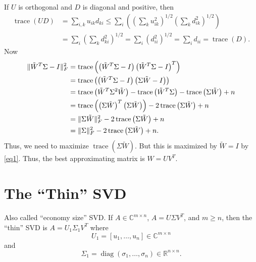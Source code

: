 \documentclass{article}
\begin{document}
If $U$ is orthogonal and $D$ is diagonal and positive, then
\begin{equation}\label{eq1}
\begin{aligned}
\operatorname{trace} (UD) &= \sum_{i,k} u_{ik} d_{ki} \leq \sum _{i}
\left ( \left ( \sum_{k} u_{ik}^{2} \right )^{1/2} \left ( \sum_{k}
d_{ik}^{2} \right )^{1/2} \right ) \\
&= \sum_{i} \left ( \sum_{k} d_{ki}^{2} \right )^{1/2} = \sum_{i}
\left ( d_{ii}^{2} \right )^{1/2} = \sum_{i} d_{ii} =
\operatorname{trace}(D).
\end{aligned}
\end{equation}
Now
\begin{align*}
\| \tilde{W}^{T} \Sigma - I \|_{F}^{2} &= \operatorname{trace}
\left ( \left( \tilde{W}^{T} \Sigma - I \right ) \left(
\tilde{W}^{T} \Sigma - I \right )^{T} \right ) \\
&= \operatorname{trace} \left ( \left( \tilde{W}^{T} \Sigma   - I
\right
) \left( \Sigma \tilde{W}  - I \right ) \right ) \\
&= \operatorname{trace} \left ( \tilde{W}^{T} \Sigma^{2} \tilde{W}
\right ) - \operatorname{trace} \left ( \tilde{W}^{T} \Sigma \right
) - \operatorname{trace} \left ( \Sigma \tilde{W} \right ) + n \\
&= \operatorname{trace} \left ( \left ( \Sigma \tilde{W} \right
)^{T} \left ( \Sigma \tilde{W}  \right ) \right ) - 2
\operatorname{trace} \left (\Sigma \tilde{W} \right ) + n \\
&= \| \Sigma \tilde{W} \|_{F}^{2} - 2 \operatorname{trace} \left
(\Sigma \tilde{W} \right ) + n \\
&= \| \Sigma  \|_{F}^{2} - 2 \operatorname{trace} \left (\Sigma
\tilde{W} \right ) + n.
\end{align*}
Thus, we need to maximize $\operatorname{trace} \left (\Sigma
\tilde{W} \right )$. But this is maximized by $ \tilde{W} = I$ by
\eqref{eq1}. Thus, the best approximating matrix is $W=UV^{T}$.


\section{The ``Thin'' SVD}
Also called ``economy size'' SVD.  If $A \in \mathbb{C}^{m \times
n}$, $A=U \Sigma V^{T}$, and $m \ge n$, then the ``thin'' SVD is
$A=U_{1} \Sigma_{1} V^{T}$ where
\begin{equation*}
U_{1} = [u_{1},\ldots,u_{n}] \in \mathbb{C}^{m \times n}
\end{equation*}
and
\begin{equation*}
\Sigma_{1} = \operatorname{diag}(\sigma_{1},\ldots,\sigma_{n}) \in
\mathbb{R}^{n \times n}.
\end{equation*}
\end{document}
